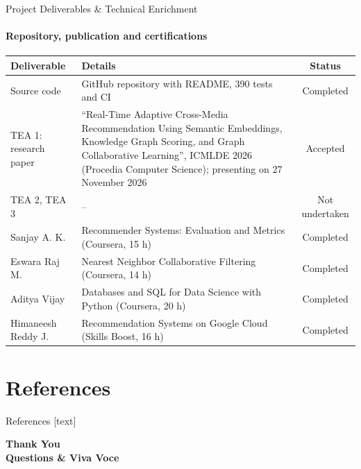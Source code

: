 \documentclass[aspectratio=169, 11pt]{beamer}
\begin{document}
\begin{frame}{Project Deliverables \& Technical Enrichment}
    \framesubtitle{Repository, publication and certifications}
    \scriptsize
    \renewcommand{\arraystretch}{1.1}
    \begin{tabular}{L{3.1cm} L{8.4cm} c}
        \toprule
        \textbf{Deliverable} & \textbf{Details} & \textbf{Status} \\
        \midrule
        Source code & GitHub repository with README, 390 tests and CI & Completed \\
        TEA 1: research paper & ``Real-Time Adaptive Cross-Media Recommendation Using Semantic Embeddings, Knowledge Graph Scoring, and Graph Collaborative Learning'', ICMLDE 2026 (Procedia Computer Science); presenting on 27 November 2026 & Accepted \\
        TEA 2, TEA 3 & -- & Not undertaken \\
        \midrule
        Sanjay A. K. & Recommender Systems: Evaluation and Metrics (Coursera, 15 h) & Completed \\
        Eswara Raj M. & Nearest Neighbor Collaborative Filtering (Coursera, 14 h) & Completed \\
        Aditya Vijay & Databases and SQL for Data Science with Python (Coursera, 20 h) & Completed \\
        Himaneesh Reddy J. & Recommendation Systems on Google Cloud (Skills Boost, 16 h) & Completed \\
        \bottomrule
    \end{tabular}
\end{frame}

\section{References}
\nocite{ak2026crossmedia,he2020lightgcn,he2017ncf,rendle2020ncfmf,rendle2009bpr,reimers2019sbert,hou2024amazon,zang2022cross}
\begin{frame}{References}
    \tiny
    \setlength{\itemsep}{0pt}[text]
    
    
\end{frame}

\begin{frame}
    \centering
    {\Huge \textbf{\textcolor{amritaMaroon}{Thank You}}} \\[0.4cm]
    {\large \textbf{Questions \& Viva Voce}}
\end{frame}
\end{document}

